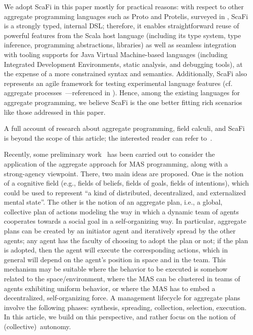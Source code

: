 \documentclass[jsan,article,accept,moreauthors,pdftex]{Definitions/mdpi}
\begin{document}
We adopt ScaFi in this paper mostly for practical reasons: with respect to other aggregate programming languages such as Proto and Protelis, surveyed in \cite{viroli2019jlamp-si-coord},
 ScaFi
 is a {strongly typed}, {internal} DSL;
  therefore, it enables straightforward reuse 
  of powerful features from the Scala host language
  (including its type system, type inference, programming abstractions, libraries)
  as well as seamless integration with tooling supports for {Java Virtual Machine}-based languages
  (including Integrated Development Environments, static analysis, and debugging tools),
  at the expense of a more constrained syntax and semantics.
%
Additionally, ScaFi also represents an agile framework for testing experimental language features (cf. {aggregate processes}~\cite{DBLP:journals/eaai/CasadeiVAPD21}---referenced in ).
%
Hence, among the existing languages for aggregate programming, we believe ScaFi is the one better fitting rich scenarios like those addressed in this paper.

%
A full account of research about aggregate programming, field calculi, and ScaFi is beyond the scope of this article; the interested reader can refer to~\cite{viroli2019jlamp-si-coord,DBLP:journals/eaai/CasadeiVAPD21}.

Recently, some preliminary work~\citep{viroli2017ijaose-aggregate-plans} has been carried out 
 to consider the application of the aggregate approach 
 for MAS programming, along with a strong-agency viewpoint. %
%
There, two main ideas are proposed.
%
One is the notion of a {cognitive field} (e.g., fields of beliefs, fields of goals, fields of intentions),
 which could be used to represent ``a kind of distributed, decentralized, and externalized mental state''.
%
The other is the notion of an {aggregate plan}, i.e., a global, collective plan of actions modeling the way in which a dynamic team of agents cooperates towards a social goal in a self-organizing way.
%
In particular, aggregate plans can be created by an initiator agent
and iteratively spread by the other agents; any agent has the faculty of choosing
to adopt the plan or not; if the plan is adopted, then the agent will execute the
corresponding actions, which in general will depend on the agent’s position in
space and in the team. This mechanism may be suitable where the behavior to
be executed is somehow related to the space/environment, where the MAS can
be clustered in teams of agents exhibiting uniform behavior, or where the MAS
has to embed a decentralized, self-organizing force. A management lifecycle for
aggregate plans involve the following phases: synthesis, spreading, collection, selection, execution.
%
In this article, we build on this perspective, and rather focus on the notion of (collective)~autonomy.
\end{document}
